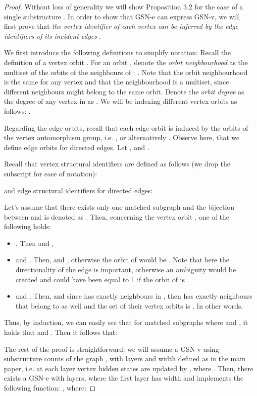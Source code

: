 \documentclass{article} \usepackage{iclr2021_conference,times}
\begin{document}
\begin{proof}
Without loss of generality we will show Proposition 3.2 for the case of a single substructure . In order to show that GSN-e can express GSN-v, we will first prove that \textit{the vertex identifier of each vertex  can be inferred by the edge identifiers of its incident edges }.

We first introduce the following definitions to simplify notation:  Recall the definition of a vertex orbit . For an orbit , denote the \textit{orbit neighbourhood}  as the multiset of the orbits of the neighbours of : . Note that the orbit neighbourhood is the same for any vertex  and that the neighbourhood is a multiset, since different neighbours might belong to the same orbit. Denote the \textit{orbit degree}  as the degree of any vertex in  as . We will be indexing different vertex orbits as follows: .

Regarding the edge orbits, recall that each edge orbit is induced by the orbits of the vertex automorphism group, i.e. , or alternatively . Observe here, that we define edge orbits for directed edges. Let ,   and . 


Recall that vertex structural identifiers are defined as follows (we drop the subscript  for ease of notation):



and edge structural identifiers for directed edges:




Let's assume that there exists only one matched subgraph  and the bijection between  and  is denoted as . Then, concerning the vertex orbit , one of the following holds:
\begin{itemize}
    \item . Then  and ,
    \item  and . Then,  and , otherwise the orbit of  would be . Note that here the directionality of the edge is important, otherwise an ambiguity would be created and  could have been equal to 1 if the orbit of  is .
    \item  and . Then,  and since  has exactly  neighbours in , then  has exactly  neighbours that belong to  as well and the set of their vertex orbits is . In other words, 
\end{itemize}

Thus, by induction, we can easily see that for  matched subgraphs  where  and , it holds that  and . Then it follows that:




The rest of the proof is straightforward: we will assume a GSN-v using substructure counts of the graph , with  layers and width  defined as in the main paper, i.e. at each layer vertex hidden states are updated by , where . Then, there exists a GSN-e with  layers, where the first layer has width  and implements the following function: , where:


\end{proof}
\end{document}

